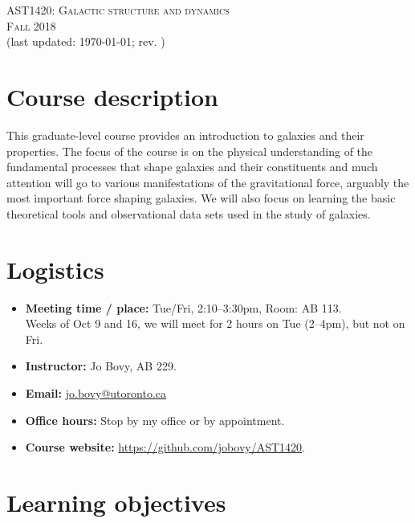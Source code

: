 \documentclass{article}
\begin{document}
\begin{center}
  \LARGE{\scshape{AST1420: Galactic structure and dynamics}}\\[5pt]
  \Large{\scshape{Fall 2018}}\\[5pt]
  \large{(last updated: \today; rev. \githash)}\\[25pt]
\end{center}

\section*{Course description}

This graduate-level course provides an introduction to galaxies and
their properties. The focus of the course is on the physical
understanding of the fundamental processes that shape galaxies and
their constituents and much attention will go to various
manifestations of the gravitational force, arguably the most important
force shaping galaxies. We will also focus on learning the basic
theoretical tools and observational data sets used in the study of
galaxies.

\section*{Logistics}

\begin{itemize}

  \item {\bf Meeting time / place:} Tue/Fri, 2:10--3:30pm, Room: AB
    113.\\ Weeks of Oct 9 and 16, we will meet for 2 hours on Tue
    (2--4pm), but not on Fri.

  \item {\bf Instructor:} Jo Bovy, AB 229.

  \item {\bf Email:} \href{mailto:jo.bovy@utoronto.ca}{jo.bovy@utoronto.ca}

  \item {\bf Office hours:} Stop by my office or by appointment.

  \item {\bf Course website:} \url{https://github.com/jobovy/AST1420}.

\end{itemize}

\section*{Learning objectives}
\end{document}
